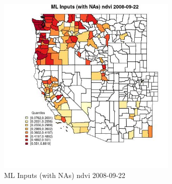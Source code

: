\begin{figure} 
\centering  
\includegraphics[width=0.77\textwidth]{Code_Outputs/Report_ML_input_PM25_Step4_part_e_de_duplicated_aves_compiled_2019-05-18wNAs_CountyndviMean2008-09-22_2008-09-22.jpg} 
\caption{\label{fig:Report_ML_input_PM25_Step4_part_e_de_duplicated_aves_compiled_2019-05-18wNAsCountyndviMean2008-09-22_2008-09-22}ML Inputs (with NAs) ndvi 2008-09-22} 
\end{figure} 
 
